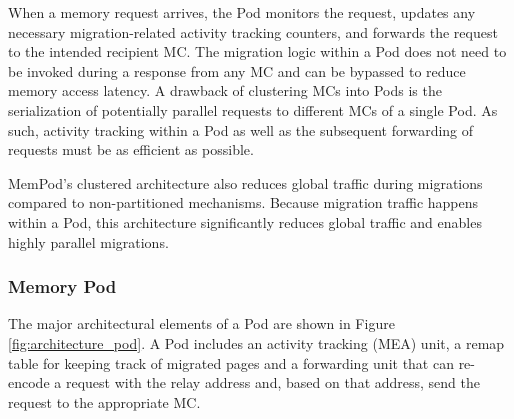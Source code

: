 When a memory request arrives, the Pod monitors the request, updates any 
necessary migration-related activity tracking counters, and forwards 
the request to the intended recipient MC. The migration logic within a Pod does not need to be invoked during a response from any MC and can be bypassed to reduce memory access latency. A drawback of clustering MCs into Pods is the serialization of potentially parallel requests to different MCs of a single Pod. As such, activity tracking within a Pod as well as the subsequent forwarding of requests must be as efficient as possible. 

MemPod's clustered architecture also reduces global traffic during migrations compared to non-partitioned mechanisms. Because migration
traffic happens within a Pod, this architecture significantly reduces global traffic and enables highly parallel migrations.

\subsubsection*{Memory Pod}

The major architectural elements of a Pod are shown in Figure \ref{fig:architecture_pod}. A Pod includes an activity tracking (MEA) unit, a remap table for keeping track of migrated pages and a forwarding unit that can re-encode a request with the relay address and, based on that address, send the request to the appropriate MC.
%

